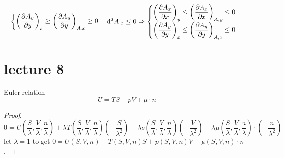 \begin{principle}
\begin{tui}
\begin{align*}
\begin{cases}
        \left(\dfrac{\partial A_{y}}{\partial y}\right)_x
        \geq \left(\dfrac{\partial A_{y}}{\partial y}\right)_{A,x}\geq 0
    \end{cases}
\hfil
\mathrm{d}^2A|_z\leq 0\Rightarrow
\begin{cases}\left(\dfrac{\partial A_{x}}{\partial x}\right)_y
    \leq \left(\dfrac{\partial A_{x}}{\partial x}\right)_{A,y}\leq 0\\
    \left(\dfrac{\partial A_{y}}{\partial y}\right)_x
    \leq \left(\dfrac{\partial A_{y}}{\partial y}\right)_{A,x}\leq 0
\end{cases}
\end{align*}
\end{tui}
\end{principle}

\section{lecture 8}
\begin{thm}
    Euler relation
\[
U = TS - pV + \mu \cdot n
\]
    \begin{proof}
\[
0 = U \left( \frac{S}{\lambda}, \frac{V}{\lambda}, \frac{n}{\lambda} \right) + \lambda T \left( \frac{S}{\lambda}, \frac{V}{\lambda}, \frac{n}{\lambda} \right) \left( -\frac{S}{\lambda^2} \right) - \lambda p \left( \frac{S}{\lambda}, \frac{V}{\lambda}, \frac{n}{\lambda} \right) \left( -\frac{V}{\lambda^2} \right) + \lambda \mu \left( \frac{S}{\lambda}, \frac{V}{\lambda}, \frac{n}{\lambda} \right) \cdot \left( -\frac{n}{\lambda^2} \right)
\]
let \(\lambda = 1\) to get \(0 = U(S, V, n) - T(S, V, n) S + p(S, V, n) V - \mu (S, V, n) \cdot n\).
    \end{proof}
\end{thm}
